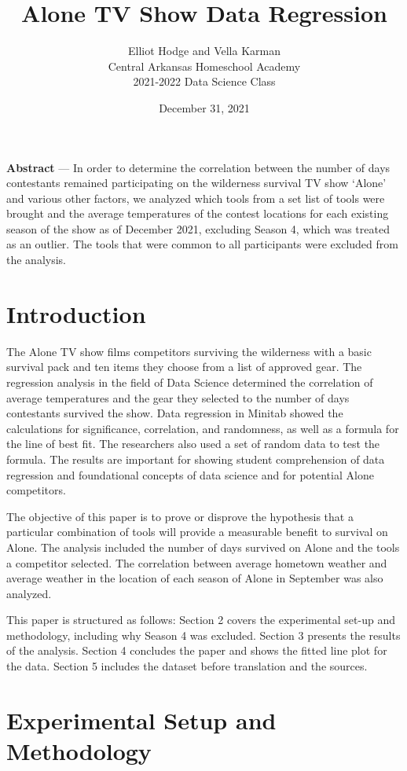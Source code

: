 \documentclass[letterpaper,twoside,11pt,twocolumn]{article}
\author{Elliot Hodge and Vella Karman\\\small{Central Arkansas Homeschool Academy}\\\small{2021-2022 Data Science Class}}
\date{December 31, 2021}
\title{\vspace{-2.2cm}Alone TV Show Data Regression}
\begin{document}
\maketitle

\noindent \textbf{Abstract} — In order to determine the correlation between the number of days contestants remained participating on the wilderness survival TV show ‘Alone’ and various other factors, we analyzed which tools from a set list of tools were brought and the average temperatures of the contest locations for each existing season of the show as of December 2021, excluding Season 4, which was treated as an outlier. The tools that were common to all participants were excluded from the analysis.

\section{Introduction}
\noindent The Alone TV show films competitors surviving the wilderness with a basic survival pack and ten items they choose from a list of approved gear. The regression analysis in the field of Data Science determined the correlation of average temperatures and the gear they selected to the number of days contestants survived the show. Data regression in Minitab showed the calculations for significance, correlation, and randomness, as well as a formula for the line of best fit. The researchers also used a set of random data to test the formula. The results are important for showing student comprehension of data regression and foundational concepts of data science and for potential Alone competitors.

The objective of this paper is to prove or disprove the hypothesis that a particular combination of tools will provide a measurable benefit to survival on Alone. The analysis included the number of days survived on Alone and the tools a competitor selected. The correlation between average hometown weather and average weather in the location of each season of Alone in September was also analyzed. 

This paper is structured as follows: Section 2 covers the experimental set-up and methodology, including why Season 4 was excluded. Section 3 presents the results of the analysis. Section 4 concludes the paper and shows the fitted line plot for the data. Section 5 includes the dataset before translation and the sources. 
\section{Experimental Setup and Methodology}
\end{document}
